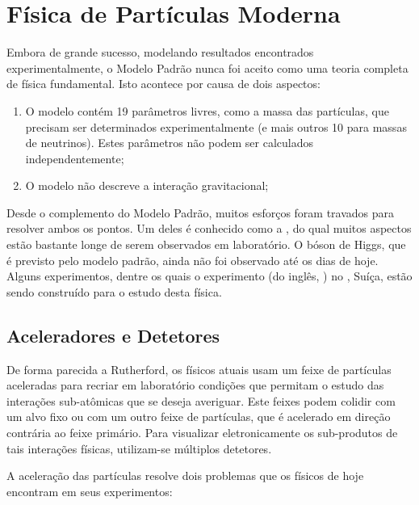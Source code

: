 \section{Física de Partículas Moderna}

Embora de grande sucesso, modelando resultados encontrados
ex\-pe\-ri\-men\-tal\-men\-te, o Modelo Pa\-drão nunca foi aceito como uma
teoria completa de física fundamental. Isto acontece por causa de dois
aspectos:

\begin{enumerate}
\item O modelo contém 19 parâmetros livres, como a massa das partículas, que
  precisam ser determinados experimentalmente (e mais outros 10 para massas de
  neutrinos). Estes parâmetros não podem ser calculados independentemente;

\item O modelo não descreve a interação gravitacional;
\end{enumerate}

Desde o complemento do Modelo Padrão, muitos esforços foram travados para
resolver ambos os pontos. Um deles é conhecido como a ,
do qual muitos aspectos estão bastante longe de serem observados em
laboratório. O bóson de Higgs, que é previsto pelo
modelo padrão, ainda não foi observado até os dias de hoje. Alguns
experimentos, dentre os quais o experimento  (do inglês, ) no , Suíça, estão sendo construído para o
estudo desta física.

\subsection{Aceleradores e Detetores}

De forma parecida a Rutherford, os físicos atuais usam um feixe de partículas
aceleradas para recriar em laboratório condições que permitam o estudo das
interações sub-atômicas que se deseja averiguar. Este feixes podem colidir com
um alvo fixo ou com um outro feixe de partículas, que é acelerado em direção
contrária ao feixe primário. Para visualizar eletronicamente os sub-produtos
de tais interações físicas, utilizam-se múltiplos detetores.

A aceleração das partículas resolve dois problemas que os físicos de hoje
encontram em seus experimentos:

